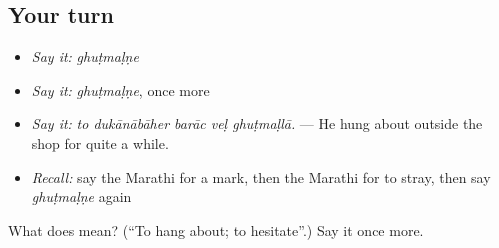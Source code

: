\subsection*{Your turn}
\begin{itemize}
\raggedright
  \item \emph{Say it:} \emph{ghuṭmaḷṇe}
  \item \emph{Say it:} \emph{ghuṭmaḷṇe}, once more
  \item \emph{Say it:} \emph{to dukānābāher barāc veḷ ghuṭmaḷlā.} — He hung about outside the shop for quite a while.
  \item \emph{Recall:} say the Marathi for a mark, then the Marathi for to stray, then say \emph{ghuṭmaḷṇe} again
\end{itemize}

\begin{tcolorbox}[breakable,colback=teal!4,colframe=teal!35!black,title={Before you move on}]
What does  mean? (\textquotedblleft{}To hang about; to hesitate\textquotedblright{}.) Say it once more.
\end{tcolorbox}
